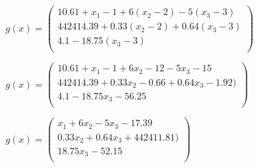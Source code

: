 \documentclass{article}
\begin{document}
\(
g(x) =
\begin{pmatrix}
10.61+x_1-1+6(x_2 - 2)-5(x_3-3)\\
442414.39+0.33(x_2-2)+0.64(x_3-3)\\
4.1-18.75(x_3-3)\\
\end{pmatrix}
\)

\(
g(x) =
\begin{pmatrix}
10.61+x_1-1+6x_2 - 12-5x_3-15\\
442414.39+0.33x_2-0.66+0.64x_3-1.92)\\
4.1-18.75x_3-56.25\\
\end{pmatrix}
\)

\(
g(x) =
\begin{pmatrix}
x_1+6x_2-5x_3-17.39\\
0.33x_2+0.64x_3+442411.81)\\
18.75x_3-52.15\\
\end{pmatrix}
\)
\end{document}
